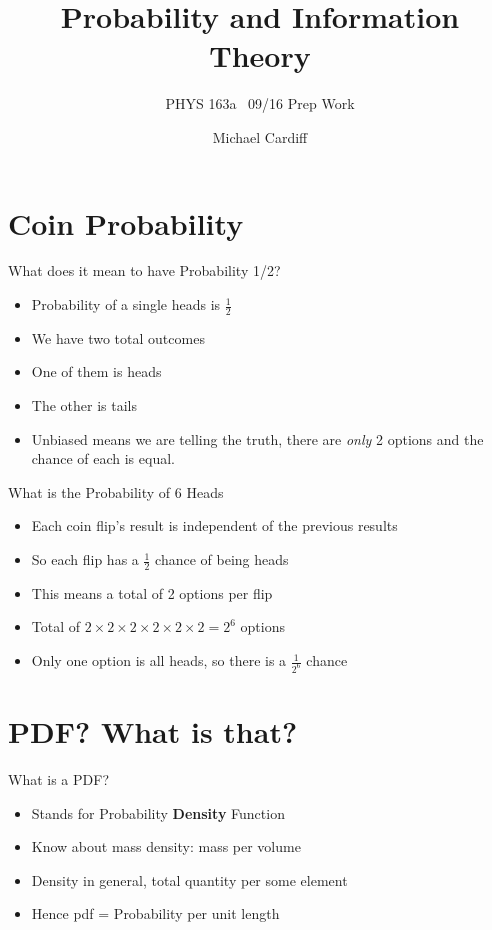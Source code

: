 \documentclass{beamer}
\title{Probability and Information Theory}
\author{Michael Cardiff}
\subtitle{PHYS 163a \ 09/16 Prep Work}
\begin{document}
\begin{frame}
  \titlepage
\end{frame}

\section{Coin Probability}
\begin{frame}{What does it mean to have Probability 1/2?}
  \begin{itemize}
  \item Probability of a single heads is $\frac12$
  \item We have two total outcomes
  \item One of them is heads
  \item The other is tails
  \item Unbiased means we are telling the truth, there are \textit{only} 2 options and the chance of each is equal.
  \end{itemize}
\end{frame}
\begin{frame}{What is the Probability of 6 Heads}
  \begin{itemize}
  \item Each coin flip's result is independent of the previous results
  \item So each flip has a $\frac12$ chance of being heads
  \item This means a total of 2 options per flip
  \item Total of $2\times2\times2\times2\times2\times2=2^6$ options
  \item Only one option is all heads, so there is a $\frac1{2^6}$ chance
  \end{itemize}
\end{frame}
\section{PDF? What is that?}
\begin{frame}{What is a PDF?}
  \begin{itemize}
  \item Stands for Probability \textbf{Density} Function
  \item Know about mass density: mass per volume
  \item Density in general, total quantity per some element
  \item Hence pdf = Probability per unit length
  \end{itemize}
\end{frame}
\end{document}
